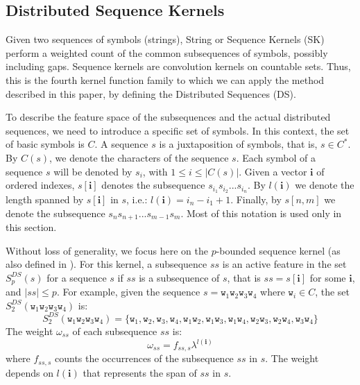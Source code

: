 \documentclass[twoside,11pt]{article}
\def\vec#1{\mathbf{#1}}
\def\mychar#1{C(#1)}
\def\nchar#1{|\mychar{#1}|}
\def\num#1#2{f_{#1,#2}}
\def\comment#1#2{}
\begin{document}
\subsection{Distributed Sequence Kernels\comment{NEW}{}}

Given two sequences of symbols (strings), String or Sequence Kernels (SK) \cite{Lodhi:2002:TCU:944790.944799} perform a weighted count of the common subsequences of symbols, possibly including gaps. Sequence kernels are convolution kernels on countable sets. Thus, this is the fourth kernel function family to which we can apply the method described in this paper, by defining the Distributed Sequences (DS).

To describe the feature space of the subsequences and the actual distributed sequences, we need to introduce a specific set of symbols. In this context, the set of basic symbols is $C$. A sequence $s$ is a juxtaposition of symbols, that is, $s \in C^*$. By $\mychar{s}$, we denote the characters of the sequence $s$. Each symbol of a sequence $s$ will be denoted by $s_i$, with $1\leq i \leq \nchar{s}$. Given a vector $\vec{i}$ of ordered indexes, $s[\vec{i}]$ denotes the subsequence $s_{i_1}s_{i_2}...s_{i_n}$. By $l(\vec{i})$ we denote the length spanned by $s[\vec{i}]$ in $s$, i.e.: $l(\vec{i})=i_n-i_1+1$. Finally, by $s[n,m]$ we denote the subsequence $s_n s_{n+1}...s_{m-1} s_m$. Most of this notation is used only in this section.



Without loss of generality, we focus here on the $p$-bounded sequence kernel (as also defined in \cite{Lodhi:2002:TCU:944790.944799}). For this kernel, a subsequence $ss$ is an active feature in the set $S^{DS}_p(s)$ for a sequence $s$ if $ss$ is a subsequence of $s$, that is $ss=s[\vec{i}]$ for some $\vec{i}$, and $|ss|\leq p$. For example, given the sequence $s=\texttt{w}_1\texttt{w}_2\texttt{w}_3\texttt{w}_4$ where $\texttt{w}_i \in C$, the set $S^{DS}_2(\texttt{w}_1\texttt{w}_2\texttt{w}_3\texttt{w}_4)$ is:
\begin{displaymath}
S^{DS}_2(\texttt{w}_1\texttt{w}_2\texttt{w}_3\texttt{w}_4) = \{\texttt{w}_1, \texttt{w}_2,  \texttt{w}_3, \texttt{w}_4,  \texttt{w}_1\texttt{w}_2,  \texttt{w}_1\texttt{w}_3,  \texttt{w}_1\texttt{w}_4, \texttt{w}_2\texttt{w}_3, \texttt{w}_2\texttt{w}_4, \texttt{w}_3\texttt{w}_4\}
\end{displaymath}
The weight $\omega_{ss}$ of each subsequence $ss$ is:
\begin{displaymath}
\omega_{ss}=\num{ss}{s}\lambda^{l(\vec{i})}
\end{displaymath}
where $\num{ss}{s}$ counts the occurrences of the subsequence $ss$ in $s$. The weight depends on $l(\vec{i})$ that represents the span of $ss$ in $s$.  
\end{document}
